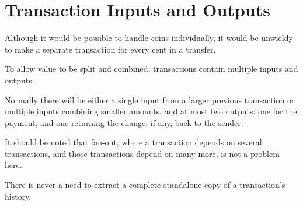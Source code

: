 \documentclass{article}
\begin{document}
\section{Transaction Inputs and Outputs}

Although it would be possible to handle coins individually, it would be unwieldy to make a separate transaction for every cent in a transfer.

To allow value to be split and combined, transactions contain multiple inputs and outputs.

Normally there will be either a single input from a larger previous transaction or multiple inputs combining smaller amounts, and at most two outputs: one for the payment, and one returning the change, if any, back to the sender.

It should be noted that fan-out, where a transaction depends on several transactions, and those transactions depend on many more, is not a problem here.

There is never a need to extract a complete standalone copy of a transaction's history.
\end{document}
